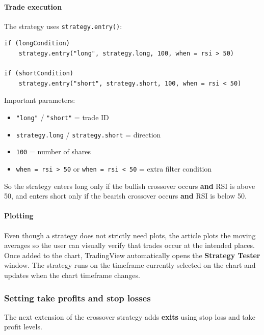 \documentclass[12pt,openany]{book}
\begin{document}
\paragraph{Trade execution}

The strategy uses \texttt{strategy.entry()}:

\begin{Verbatim}[breaklines=true,breakanywhere=true,fontsize=\small]
if (longCondition)
    strategy.entry("long", strategy.long, 100, when = rsi > 50)

if (shortCondition)
    strategy.entry("short", strategy.short, 100, when = rsi < 50)
\end{Verbatim}

Important parameters:

\begin{itemize}[leftmargin=*]
    \item \texttt{"long"} / \texttt{"short"} = trade ID
    \item \texttt{strategy.long} / \texttt{strategy.short} = direction
    \item \texttt{100} = number of shares
    \item \texttt{when = rsi > 50} or \texttt{when = rsi < 50} = extra filter condition
\end{itemize}

So the strategy enters long only if the bullish crossover occurs \textbf{and} RSI is above 50, and enters short only if the bearish crossover occurs \textbf{and} RSI is below 50.

\paragraph{Plotting}

Even though a strategy does not strictly need plots, the article plots the moving averages so the user can visually verify that trades occur at the intended places. Once added to the chart, TradingView automatically opens the \textbf{Strategy Tester} window. The strategy runs on the timeframe currently selected on the chart and updates when the chart timeframe changes.

\subsubsection{Setting take profits and stop losses}

The next extension of the crossover strategy adds \textbf{exits} using stop loss and take profit levels.
\end{document}

